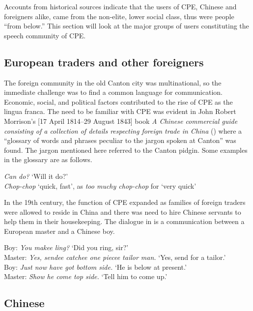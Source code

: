 \documentclass[english,output=paper,colorlinks,citecolor=brown]{../langscibook}
\begin{document}
Accounts from historical sources indicate that the users of CPE, Chinese and foreigners alike, came from the non-elite, lower social class, thus were people “from below.” This section will look at the major groups of users constituting the speech community of CPE. 

\subsection{European traders and other foreigners}\label{sec:7:4.1}

The foreign community in the old Canton city was multinational, so the immediate challenge was to find a common language for communication. Economic, social, and political factors contributed to the rise of CPE as the lingua franca. The need to be familiar with CPE was evident in John Robert Morrison’s [17 April 1814--29 August 1843] book \textit{A Chinese commercial guide consisting of a collection of details respecting foreign trade in China} (\citeyear{Morrison1834}) where a “glossary of words and phrases peculiar to the jargon spoken at Canton” was found. The jargon mentioned here referred to the Canton pidgin. Some examples in the glossary are as follows.

\ea 
    \label{ex:7:1}
    \textit{Can do?} ‘Will it do?’\\
    \textit{Chop-chop} ‘quick, fast’, as \textit{too muchy chop-chop} for ‘very quick’
\z

In the 19th century, the function of CPE expanded as families of foreign traders were allowed to reside in China and there was need to hire Chinese servants to help them in their housekeeping. The dialogue in  is a communication between a European master and a Chinese boy. 

\ea \label{ex:7:2}
Boy: \textit{You makee ling?} ‘Did you ring, sir?’\\
Master: \textit{Yes, sendee catchee one piecee tailor man.} ‘Yes, send for a tailor.’\\
Boy: \textit{Just now have got bottom side.} ‘He is below at present.’\\
Master: \textit{Show he come top side.} ‘Tell him to come up.’\\

\citep[43]{Anonymous1860}
\z

\subsection{Chinese}\label{sec:7:4.2}
\end{document}
